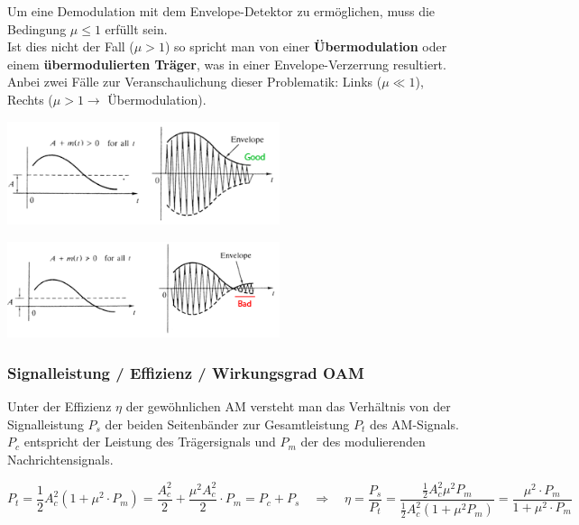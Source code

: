 Um eine Demodulation mit dem Envelope-Detektor zu ermöglichen, muss die Bedingung 
\textbf{$\mu \leq 1$} erfüllt sein. \\
Ist dies nicht der Fall (\textbf{$\mu > 1$}) so spricht man von einer \textbf{Übermodulation} oder
einem  \textbf{übermodulierten Träger}, was in einer Envelope-Verzerrung resultiert. \\
Anbei zwei Fälle zur Veranschaulichung dieser Problematik: Links ($\mu \ll 1$), Rechts ($\mu > 1
\rightarrow $ Übermodulation).

\begin{minipage}[t][2.3cm][c]{9.5cm}
	\begin{center}
      \includegraphics[width=8cm]{bilder/am_oam_enveloppeGood.png}
	\end{center}
\end{minipage}
\begin{minipage}[t][2.3cm][c]{9.5cm}
    \begin{center}
    	\includegraphics[width=8cm]{bilder/am_oam_enveloppeBad.png}
	\end{center}
\end{minipage}

\subsubsection{Signalleistung / Effizienz / Wirkungsgrad OAM }
Unter der Effizienz $ \eta $ der gewöhnlichen AM versteht man das Verhältnis von der Signalleistung
$P_s$ der beiden Seitenbänder zur Gesamtleistung $P_t$ des AM-Signals. $P_c$ entspricht der Leistung des Trägersignals und $P_m$ der des modulierenden Nachrichtensignals.

\[ P_t = \frac{1}{2}A_c^2(1 + \mu^2 \cdot P_m) =  \frac{A_c^2}{2} + \frac{\mu^2 A_c^2}{2}\cdot P_m = P_c + P_s  \quad 
\Longrightarrow 
\quad \eta = \frac{P_s}{P_t} = \frac{\frac{1}{2}A_c^2 \mu^2 P_m}{\frac{1}{2}A_c^2(1 + \mu^2 P_m)} = \frac{\mu^2 \cdot P_m}{1 + \mu^2 \cdot P_m}\]

